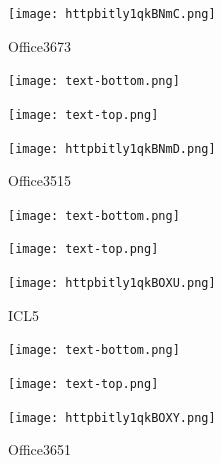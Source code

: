 \documentclass[letterpaper]{article}
\begin{document}
 \begingroup 
 \centerline{\texttt{[image: httpbitly1qkBNmC.png]}} 
 \endgroup 
 \vspace*{\fill} 

 \hfill{\small Office3673} 

  \vspace{0.7in} 
 
 \centerline{\texttt{[image: text-bottom.png]}} 
 
 \pagebreak 
{} 
 \vspace*{\fill} 
 
  \centerline{\texttt{[image: text-top.png]}} 
 
 \vspace{0.5in} 
 
 \begingroup 
 \centerline{\texttt{[image: httpbitly1qkBNmD.png]}} 
 \endgroup 
 \vspace*{\fill} 

 \hfill{\small Office3515} 

  \vspace{0.7in} 
 
 \centerline{\texttt{[image: text-bottom.png]}} 
 
 \pagebreak 
{} 
 \vspace*{\fill} 
 
  \centerline{\texttt{[image: text-top.png]}} 
 
 \vspace{0.5in} 
 
 \begingroup 
 \centerline{\texttt{[image: httpbitly1qkBOXU.png]}} 
 \endgroup 
 \vspace*{\fill} 

 \hfill{\small ICL5} 

  \vspace{0.7in} 
 
 \centerline{\texttt{[image: text-bottom.png]}} 
 
 \pagebreak 
{} 
 \vspace*{\fill} 
 
  \centerline{\texttt{[image: text-top.png]}} 
 
 \vspace{0.5in} 
 
 \begingroup 
 \centerline{\texttt{[image: httpbitly1qkBOXY.png]}} 
 \endgroup 
 \vspace*{\fill} 

 \hfill{\small Office3651} 

  \vspace{0.7in} 
 
\end{document}
